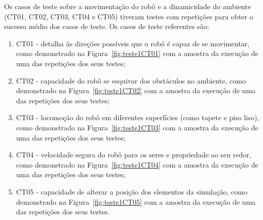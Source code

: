 Os casos de teste sobre a movimentação do robô e a dinamicidade do ambiente (CT01, CT02, CT03, CT04 e CT05) tiveram testes com repetições para obter o sucesso médio dos casos de teste. Os casos de teste referentes são:
\begin{enumerate}
    \item CT01 - detalha às direções possíveis que o robô é capaz de se movimentar, como demonstrado na Figura~\ref{fig:teste1CT01} com a amostra da execução de uma das repetições dos seus testes;
    \item CT02 - capacidade do robô se esquivar dos obstáculos no ambiente, como demonstrado na Figura~\ref{fig:teste1CT02}  com a amostra da execução de uma das repetições dos seus testes;
    \item CT03 - locomoção do robô em diferentes superfícies (como tapete e piso liso), como demonstrado na Figura~\ref{fig:teste1CT03}  com a amostra da execução de uma das repetições dos seus testes;
    \item CT04 - velocidade segura do robô para os seres e propriedade ao seu redor, como demonstrado na Figura~\ref{fig:teste1CT04}  com a amostra da execução de uma das repetições dos seus testes;
    \item CT05 - capacidade de alterar a posição dos elementos da simulação, como demonstrado na Figura~\ref{fig:teste1CT05}  com a amostra da execução de uma das repetições dos seus testes.
\end{enumerate}

